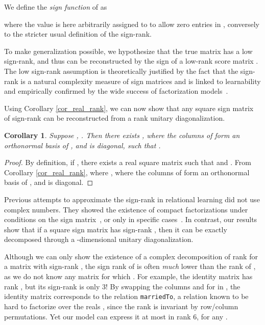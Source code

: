 \documentclass[twoside,11pt]{article}
\renewcommand{\cite}{\citep}
\newtheorem{cor}{Corollary}
\begin{document}
We define the \emph{sign function} of  as 

where the value  is here arbitrarily assigned to  to allow zero entries in ,
conversely to the stricter usual definition of the sign-rank.


To make generalization possible, we hypothesize that the true matrix 
has a low sign-rank, and thus can be reconstructed by the sign of a low-rank score
matrix . 
The low sign-rank assumption is theoretically justified by the fact that the sign-rank is a natural complexity measure of sign matrices \mbox{\cite{Linial2007}} and is linked to learnability \cite{alon2016sign} and empirically confirmed by the wide success of factorization models~\cite{nickel_2016_review}. 




Using Corollary \ref{cor_real_rank}, we can now show that any square sign matrix of sign-rank  can be reconstructed from a rank  unitary diagonalization.

\begin{cor}
\label{cor_sign_rank}
Suppose , . Then there exists 
,  where the columns of  form an orthonormal basis of , and  is diagonal,
such that .
\end{cor}


\begin{proof}
By definition, if , there exists a real square matrix  such that
 and .
From Corollary \ref{cor_real_rank},  where ,  where the columns of  form an orthonormal basis of , and  is diagonal.
\end{proof}

Previous attempts to approximate the sign-rank in relational learning 
did not use complex numbers. 
They showed the existence of compact factorizations under 
conditions on the sign matrix~\cite{nickel2014reducing}, or only in specific cases~\cite{bouchard2015approximate}.
In contrast, our results show that if a square sign matrix
has sign-rank , then it can be exactly decomposed through a -dimensional
unitary diagonalization.







Although we can only show the existence of a complex decomposition of rank  for a matrix
with sign-rank , the sign rank of  is often \emph{much} lower 
than the rank of , as we do not know any matrix 
 for
which   \cite{alon2016sign}. 
For example, the   identity matrix
has rank , but its sign-rank is only 3! By swapping the columns  and  
for  in , the identity matrix corresponds to the
relation \texttt{marriedTo}, a relation known to be hard to
factorize over the reals \cite{nickel2014reducing}, since the rank
is invariant by row/column permutations. Yet our model can express it 
at most in rank 6, for any .
\end{document}
